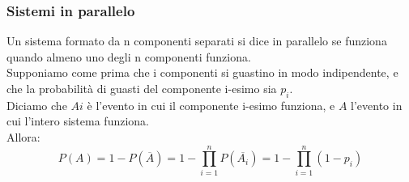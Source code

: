 \documentclass{article}
\begin{document}
\subsubsection{Sistemi in parallelo}
Un sistema formato da n componenti separati si dice in parallelo se funziona quando almeno uno degli n componenti funziona.\\
Supponiamo come prima che i componenti si guastino in modo indipendente, e che la probabilità di guasti del componente i-esimo sia $p_i$.\\
Diciamo che $Ai$ è l'evento in cui il componente i-esimo funziona, e $A$ l'evento in cui l'intero sistema funziona.\\
Allora:
\begin{equation}
P(A) = 1 - P(\overline{A}) = 1 - \prod\limits_{i=1}^{n}P(\overline{A_i}) = 1-\prod\limits_{i=1}^{n}(1-p_i)
\end{equation}
\end{document}
